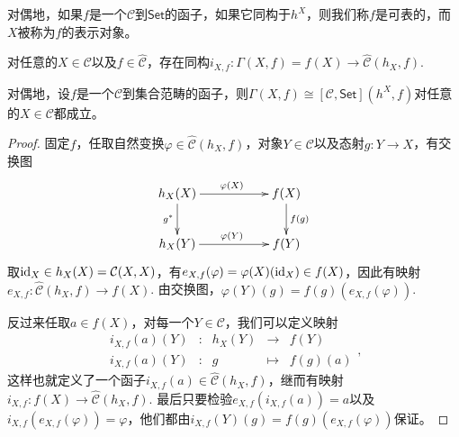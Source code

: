 对偶地，如果$f$是一个$\mathcal{C}$到$\mathsf{Set}$的函子，如果它同构于$h^X$，则我们称$f$是可表的，而$X$被称为$f$的表示对象。

\begin{lem}
对任意的$X\in \mathcal{C}$以及$f\in \hat{\mathcal{C}}$，存在同构$i_{X,f}:\Gamma(X,f)=f(X)\to {\hat{\mathcal{C}}}(h_X,f)$.
\end{lem}

对偶地，设$f$是一个$\mathcal{C}$到集合范畴的函子，则$\Gamma(X,f)\cong [\mathcal{C},\mathsf{Set}](h^X,f)$对任意的$X\in \mathcal{C}$都成立。

\begin{proof}
	固定$f$，任取自然变换$\varphi\in {\hat{\mathcal{C}}}(h_X,f)$，对象$Y\in\mathcal{C}$以及态射$g:Y\to X$，有交换图
	\[
	\begin{xy}
		\xymatrix{
			h_X(X)\ar[rr]^{\varphi(X)} \ar[d]_{g^*}&&f(X) \ar[d]^{f(g)}\\
			h_X(Y)\ar[rr]^{\varphi(Y)}&&f(Y)
		}
	\end{xy}
	\]
	取$\operatorname{id}_X\in h_X(X)=\mathcal{C}(X,X)$，有$e_{X,f}(\varphi)=\varphi(X)(\operatorname{id}_X)\in f(X)$，因此有映射$e_{X,f}:{\hat{\mathcal{C}}}(h_X,f)\to f(X)$. 由交换图，$\varphi(Y)(g)=f(g)\left(e_{X,f}(\varphi)\right)$.

	反过来任取$a\in f(X)$，对每一个$Y\in\mathcal{C}$，我们可以定义映射
	\[
	\begin{array}{ccccc}
	i_{X,f}(a)(Y)&:&h_X(Y)&\to &f(Y)\\
	i_{X,f}(a)(Y)&:&g&\mapsto&f(g)(a)
	\end{array},
	\]
	这样也就定义了一个函子$i_{X,f}(a)\in {\hat{\mathcal{C}}}(h_X,f)$，继而有映射$i_{X,f}:f(X)\to {\hat{\mathcal{C}}}(h_X,f)$. 最后只要检验$e_{X,f}(i_{X,f}(a))=a$以及$i_{X,f}(e_{X,f}(\varphi))=\varphi$，他们都由$i_{X,f}(Y)(g)=f(g)\left(e_{X,f}(\varphi)\right)$保证。
\end{proof}



